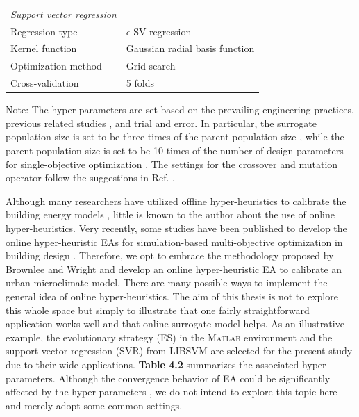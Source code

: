 \begin{table}[h]
\begin{center}
\begin{tabular}{ll}
\textit{Support vector regression}\vspace{6pt}      &                                \\
\hspace{9pt}Regression type                         & $\epsilon$-SV regression                \\
\hspace{9pt}Kernel function                         & Gaussian radial basis function \\
\hspace{9pt}Optimization method                     & Grid search                    \\
\hspace{9pt}Cross-validation                        & 5 folds                       
 \\
\bottomrule
\end{tabular}
\end{center}
Note: The hyper-parameters are set based on the prevailing engineering practices, previous related studies \cite{jin2005comprehensive,tenne2010computational,brownlee2015constrained,jin2011surrogate,deep2009real}, and trial and error. In particular, the surrogate population size is set to be three times of the parent population size \cite{brownlee2015constrained}, while the parent population size is set to be 10 times of the number of design parameters for single-objective optimization \cite{deep2009real}. The settings for the crossover and mutation operator follow the suggestions in Ref. \cite{deep2009real}. 
\end{table}

Although many researchers have utilized offline hyper-heuristics to calibrate the building energy models \cite{o2013leveraging,manfren2013calibration}, little is known to the author about the use of online hyper-heuristics. Very recently, some studies have been published to develop the online hyper-heuristic EAs for simulation-based multi-objective optimization in building design \cite{brownlee2015constrained,xu2016improving}. Therefore, we opt to embrace the methodology proposed by Brownlee and Wright \cite{brownlee2015constrained} and develop an online hyper-heuristic EA to calibrate an urban microclimate model. There are many possible ways to implement the general idea of online hyper-heuristics. The aim of this thesis is not to explore this whole space but simply to illustrate that one fairly straightforward application works well and that online surrogate model helps. As an illustrative example, the evolutionary strategy (ES) \cite{hansen1996adapting} in the \textsc{Matlab} environment and the support vector regression (SVR) \cite{cortes1995support} from LIBSVM \cite{chang2011libsvm} are selected for the present study due to their wide applications. \textbf{Table 4.2} summarizes the associated hyper-parameters. Although the convergence behavior of EA could be significantly affected by the hyper-parameters \cite{alajmi2014selecting}, we do not intend to explore this topic here and merely adopt some common settings.

